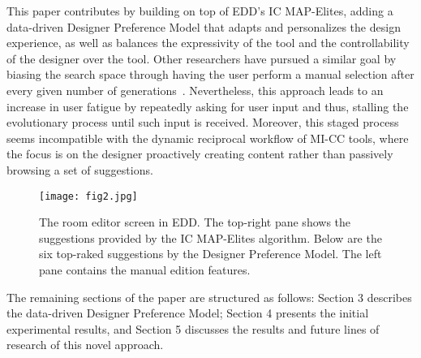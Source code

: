 This paper contributes by building on top of EDD's IC MAP-Elites, adding a data-driven Designer Preference Model that adapts and personalizes the design experience, as well as balances the expressivity of the tool and the controllability of the designer over the tool. Other researchers have pursued a similar goal by biasing the search space through having the user perform a manual selection after every given number of generations~. Nevertheless, this approach leads to an increase in user fatigue by repeatedly asking for user input and thus, stalling the evolutionary process until such input is received. Moreover, this staged process seems incompatible with the dynamic reciprocal workflow of MI-CC tools, where the focus is on the designer proactively creating content rather than passively browsing a set of suggestions.

\begin{figure}[t]
\texttt{[image: fig2.jpg]}
\caption{The room editor screen in EDD. The top-right pane shows the suggestions provided by the IC MAP-Elites algorithm. Below are the six top-raked suggestions by the Designer Preference Model. The left pane contains the manual edition features.} \label{p5fig2}
\end{figure}

The remaining sections of the paper are structured as follows: Section 3 describes the data-driven Designer Preference Model; Section 4 presents the initial experimental results, and Section 5 discusses the results and future lines of research of this novel approach.

